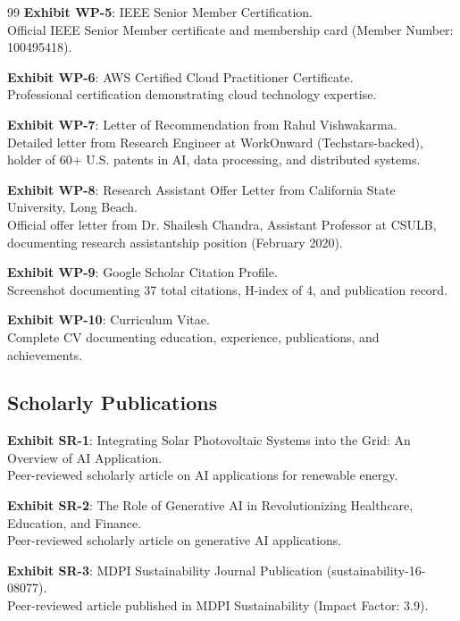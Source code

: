 \documentclass[11pt]{article}
\begin{document}
\begin{thebibliography}{99}
\textbf{Exhibit WP-5}: IEEE Senior Member Certification.\\
Official IEEE Senior Member certificate and membership card (Member Number: 100495418).

\textbf{Exhibit WP-6}: AWS Certified Cloud Practitioner Certificate.\\
Professional certification demonstrating cloud technology expertise.

\textbf{Exhibit WP-7}: Letter of Recommendation from Rahul Vishwakarma.\\
Detailed letter from Research Engineer at WorkOnward (Techstars-backed), holder of 60+ U.S. patents in AI, data processing, and distributed systems.

\textbf{Exhibit WP-8}: Research Assistant Offer Letter from California State University, Long Beach.\\
Official offer letter from Dr. Shailesh Chandra, Assistant Professor at CSULB, documenting research assistantship position (February 2020).

\textbf{Exhibit WP-9}: Google Scholar Citation Profile.\\
Screenshot documenting 37 total citations, H-index of 4, and publication record.

\textbf{Exhibit WP-10}: Curriculum Vitae.\\
Complete CV documenting education, experience, publications, and achievements.

\subsection*{Scholarly Publications}

\textbf{Exhibit SR-1}: Integrating Solar Photovoltaic Systems into the Grid: An Overview of AI Application.\\
Peer-reviewed scholarly article on AI applications for renewable energy.

\textbf{Exhibit SR-2}: The Role of Generative AI in Revolutionizing Healthcare, Education, and Finance.\\
Peer-reviewed scholarly article on generative AI applications.

\textbf{Exhibit SR-3}: MDPI Sustainability Journal Publication (sustainability-16-08077).\\
Peer-reviewed article published in MDPI Sustainability (Impact Factor: 3.9).


\end{thebibliography}
\end{document}
